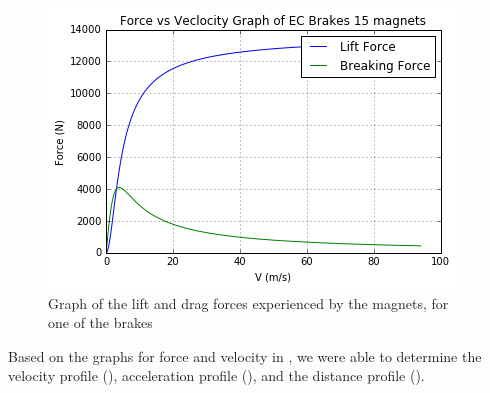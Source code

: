 \documentclass[main.tex]{subfiles}
\begin{document}
    \begin{figure}
        \centering
        \includegraphics[width=\linewidth]{images/force_velocity_graph.png}
        \caption{Graph of the lift and drag forces experienced by the magnets, for one of the brakes}
        \label{fig:force-velocity-graph}
    \end{figure}
    Based on the graphs for force and velocity in , we were able to determine the velocity profile (), acceleration profile (), and the distance profile ().\\
\end{document}
